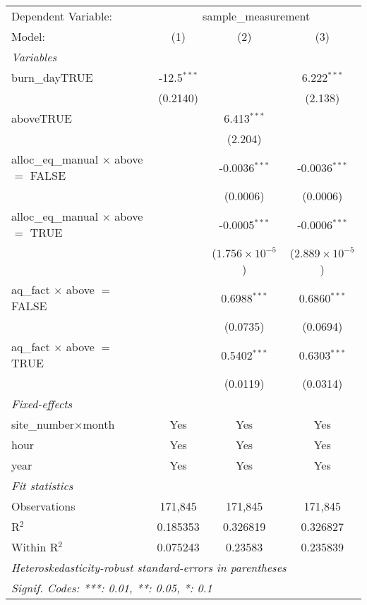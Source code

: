 \begin{tabular}{lccc}
\tabularnewline\midrule\midrule
Dependent Variable:&\multicolumn{3}{c}{sample\_measurement}\\
Model:&(1) & (2) & (3)\\
\midrule \emph{Variables}&   &   &  \\
burn\_dayTRUE&-12.5$^{***}$ &    & 6.222$^{***}$\\
  &(0.2140) &    & (2.138)\\
aboveTRUE&   & 6.413$^{***}$ &   \\
  &   & (2.204) &   \\
alloc\_eq\_manual $\times $ above $=$ FALSE&   & -0.0036$^{***}$ & -0.0036$^{***}$\\
  &   & (0.0006) & (0.0006)\\
alloc\_eq\_manual $\times $ above $=$ TRUE&   & -0.0005$^{***}$ & -0.0006$^{***}$\\
  &   & ($1.756\times 10^{-5}$) & ($2.889\times 10^{-5}$)\\
aq\_fact $\times $ above $=$ FALSE&   & 0.6988$^{***}$ & 0.6860$^{***}$\\
  &   & (0.0735) & (0.0694)\\
aq\_fact $\times $ above $=$ TRUE&   & 0.5402$^{***}$ & 0.6303$^{***}$\\
  &   & (0.0119) & (0.0314)\\
\midrule \emph{Fixed-effects}&   &   &  \\
site\_number$\times$month & Yes & Yes & Yes\\
hour & Yes & Yes & Yes\\
year & Yes & Yes & Yes\\
\midrule \emph{Fit statistics}&  & & \\
Observations & 171,845&171,845&171,845\\
R$^2$ & 0.185353&0.326819&0.326827\\
Within R$^2$ & 0.075243&0.23583&0.235839\\
\midrule\midrule\multicolumn{4}{l}{\emph{Heteroskedasticity-robust standard-errors in parentheses}}\\
\multicolumn{4}{l}{\emph{Signif. Codes: ***: 0.01, **: 0.05, *: 0.1}}\\
\end{tabular}


